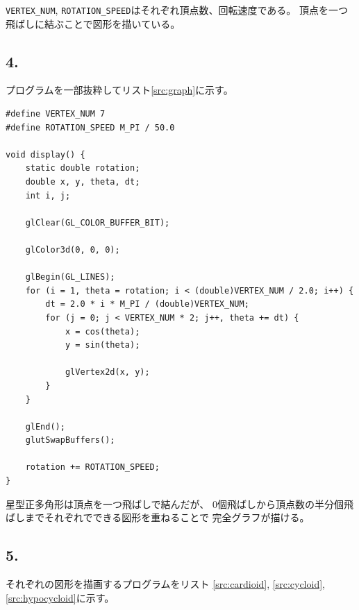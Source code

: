 \documentclass{jsarticle}
\begin{document}
        \verb|VERTEX_NUM|, \verb|ROTATION_SPEED|はそれぞれ頂点数、回転速度である。
        頂点を一つ飛ばしに結ぶことで図形を描いている。

    \subsection*{4.}
        プログラムを一部抜粋してリスト\ref{src:graph}に示す。

        \begin{lstlisting}[caption=完全グラフを描くプログラム, label=src:graph]
#define VERTEX_NUM 7
#define ROTATION_SPEED M_PI / 50.0

void display() {
    static double rotation;
    double x, y, theta, dt;
    int i, j;
    
    glClear(GL_COLOR_BUFFER_BIT);

    glColor3d(0, 0, 0);

    glBegin(GL_LINES);
    for (i = 1, theta = rotation; i < (double)VERTEX_NUM / 2.0; i++) {
        dt = 2.0 * i * M_PI / (double)VERTEX_NUM;
        for (j = 0; j < VERTEX_NUM * 2; j++, theta += dt) {
            x = cos(theta);
            y = sin(theta);

            glVertex2d(x, y);
        }
    }

    glEnd();
    glutSwapBuffers();

    rotation += ROTATION_SPEED;
}\end{lstlisting}

        星型正多角形は頂点を一つ飛ばしで結んだが、
        0個飛ばしから頂点数の半分個飛ばしまでそれぞれでできる図形を重ねることで
        完全グラフが描ける。

    \subsection*{5.}
        それぞれの図形を描画するプログラムをリスト
        \ref{src:cardioid}, \ref{src:cycloid}, \ref{src:hypocycloid}に示す。
\end{document}
